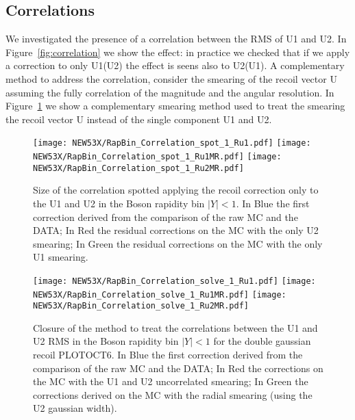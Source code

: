 \documentclass[41pt,a4paper,oneside]{report}
\begin{document}
\subsection{Correlations}
\label{sec:Correlation}

We investigated the presence of a correlation between the RMS of U1 and U2.
In Figure~\ref{fig:correlation} we show the effect: in practice we checked that if we apply a correction to only U1(U2) the effect is seens also to U2(U1). 
A complementary method to address the correlation, consider the smearing of the recoil vector U assuming the fully correlation of the magnitude and the angular resolution.
In Figure~\ref{fig:correlationSolve} we show a complementary smearing method used to treat the smearing the recoil vector U instead of the single component U1 and U2.

\begin{figure}[h!]
  \begin{center}
    \texttt{[image: NEW53X/RapBin\_Correlation\_spot\_1\_Ru1.pdf]}
    \texttt{[image: NEW53X/RapBin\_Correlation\_spot\_1\_Ru1MR.pdf]}
    \texttt{[image: NEW53X/RapBin\_Correlation\_spot\_1\_Ru2MR.pdf]}
    \caption{Size of the correlation spotted applying the recoil correction only to the U1 and U2 in the Boson rapidity bin $|Y|<1$.
      In Blue the first correction derived from the comparison of the raw MC and the DATA; 
      In Red the residual corrections on the MC with the only U2 smearing;
      In Green the residual corrections on the MC with the only U1 smearing. {\color{blue}{plot oder than OCT6}}}
    \label{fig:correlation}
  \end{center}
  \begin{center}
    \texttt{[image: NEW53X/RapBin\_Correlation\_solve\_1\_Ru1.pdf]}
    \texttt{[image: NEW53X/RapBin\_Correlation\_solve\_1\_Ru1MR.pdf]}
    \texttt{[image: NEW53X/RapBin\_Correlation\_solve\_1\_Ru2MR.pdf]}
    \caption{Closure of the method to treat the correlations between the U1 and U2 RMS in the Boson rapidity bin $|Y|<1$ for the double gaussian recoil PLOTOCT6.
      In Blue the first correction derived from the comparison of the raw MC and the DATA; 
      In Red the corrections on the MC with the U1 and U2 uncorrelated smearing; 
      In Green the corrections derived on the MC with the radial smearing (using the U2 gaussian width). {\color{blue}{plot oder than OCT6}}}
    \label{fig:correlationSolve}
  \end{center}
\end{figure}
\end{document}
